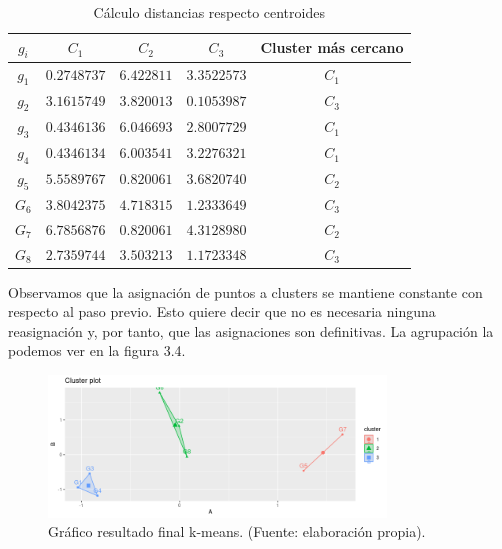 \begin{ejemplo}
    \begin{table}[h]
        \centering
        \begin{tabular}{|c|c|c|c|c|}
            \hline
            \textbf{$g_{i}$} & \textbf{$C_{1}$} & \textbf{$C_{2}$} & \textbf{$C_{3}$} & \textbf{Cluster más cercano}\\
            \hline
            $g_{1}$ & $0.2748737$ & $6.422811$ & $3.3522573$ & $C_{1}$\\
            \hline
            $g_{2}$ & $3.1615749$ & $3.820013$  & $0.1053987$ & $C_{3}$\\
            \hline
            $g_{3}$ & $0.4346136$ & $6.046693$ & $2.8007729$ & $C_{1}$\\
            \hline
            $g_{4}$ & $0.4346134$ & $6.003541$ & $3.2276321$ & $C_{1}$\\
            \hline
            $g_{5}$ & $5.5589767$ & $0.820061$ & $3.6820740$ & $C_{2}$\\
            \hline
            $G_{6}$ & $3.8042375$ & $4.718315$ & $1.2333649$ & $C_{3}$\\
            \hline
            $G_{7}$ & $6.7856876$ & $0.820061$ & $4.3128980$ & $C_{2}$\\
            \hline
            $G_{8}$ & $2.7359744$ & $3.503213$ & $1.1723348$ & $C_{3}$ \\
            \hline
            
        \end{tabular}
        \caption{Cálculo distancias respecto centroides}

    \end{table}

    Observamos que la asignación de puntos a clusters se mantiene constante con respecto al paso previo. Esto quiere decir que no es necesaria ninguna
    reasignación y, por tanto, que las asignaciones son definitivas. La agrupación la podemos ver en la figura 3.4.

    \begin{figure}[h]
        \centering
        \includegraphics[width=0.8\textwidth]{../img/kmeans.png}
        \caption{Gráfico resultado final k-means. (Fuente: elaboración propia).}
    \end{figure}
    
    
\end{ejemplo}

